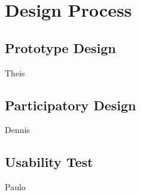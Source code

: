 \section{Design Process}
\subsection{Prototype Design}Theis\\

\subsection{Participatory Design}Dennis\\

\subsection{Usability Test}Paulo\\
